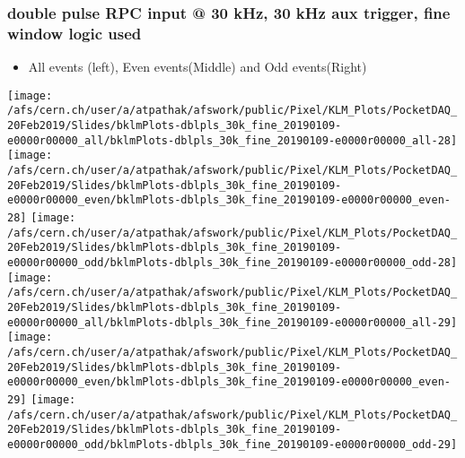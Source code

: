 \documentclass{beamer}
\begin{document}
\begin{frame}
\frametitle{\small double pulse RPC input @ 30 kHz, 30 kHz aux trigger, fine window logic used}
\vspace*{.05cm}
\begin{center}
 \begin{itemize}
\item { \small All events (left), Even events(Middle) and Odd events(Right)}
\end{itemize}
\begin{normalsize}

\vspace*{-.2cm}
\begin{center}

\texttt{[image: /afs/cern.ch/user/a/atpathak/afswork/public/Pixel/KLM\_Plots/PocketDAQ\_20Feb2019/Slides/bklmPlots-dblpls\_30k\_fine\_20190109-e0000r00000\_all/bklmPlots-dblpls\_30k\_fine\_20190109-e0000r00000\_all-28]}
\texttt{[image: /afs/cern.ch/user/a/atpathak/afswork/public/Pixel/KLM\_Plots/PocketDAQ\_20Feb2019/Slides/bklmPlots-dblpls\_30k\_fine\_20190109-e0000r00000\_even/bklmPlots-dblpls\_30k\_fine\_20190109-e0000r00000\_even-28]}
\texttt{[image: /afs/cern.ch/user/a/atpathak/afswork/public/Pixel/KLM\_Plots/PocketDAQ\_20Feb2019/Slides/bklmPlots-dblpls\_30k\_fine\_20190109-e0000r00000\_odd/bklmPlots-dblpls\_30k\_fine\_20190109-e0000r00000\_odd-28]} \\

\texttt{[image: /afs/cern.ch/user/a/atpathak/afswork/public/Pixel/KLM\_Plots/PocketDAQ\_20Feb2019/Slides/bklmPlots-dblpls\_30k\_fine\_20190109-e0000r00000\_all/bklmPlots-dblpls\_30k\_fine\_20190109-e0000r00000\_all-29]}
\texttt{[image: /afs/cern.ch/user/a/atpathak/afswork/public/Pixel/KLM\_Plots/PocketDAQ\_20Feb2019/Slides/bklmPlots-dblpls\_30k\_fine\_20190109-e0000r00000\_even/bklmPlots-dblpls\_30k\_fine\_20190109-e0000r00000\_even-29]}
\texttt{[image: /afs/cern.ch/user/a/atpathak/afswork/public/Pixel/KLM\_Plots/PocketDAQ\_20Feb2019/Slides/bklmPlots-dblpls\_30k\_fine\_20190109-e0000r00000\_odd/bklmPlots-dblpls\_30k\_fine\_20190109-e0000r00000\_odd-29]} \\

\end{center}
\end{normalsize}
\end{center}
\end{frame}
\end{document}
